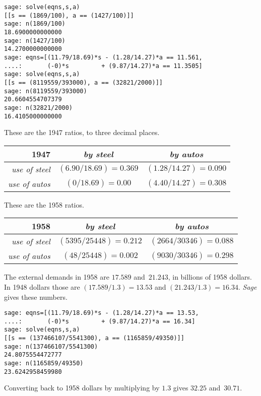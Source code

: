 \begin{exercises}
\begin{answer}
\begin{exparts}
\begin{lstlisting}
sage: solve(eqns,s,a)
[[s == (1869/100), a == (1427/100)]]
sage: n(1869/100)
18.6900000000000
sage: n(1427/100)
14.2700000000000
sage: eqns=[(11.79/18.69)*s - (1.28/14.27)*a == 11.561,
....:       (-0)*s         + (9.87/14.27)*a == 11.3505]
sage: solve(eqns,s,a)
[[s == (8119559/393000), a == (32821/2000)]]
sage: n(8119559/393000)
20.6604554707379
sage: n(32821/2000)
16.4105000000000            
\end{lstlisting}
	\partsitem
          These are the 1947 ratios, to three decimal places.
	  \begin{center}
            \begin{tabular}{r|cc}
               1947   &\textit{by steel}  &\textit{by autos}  \\ \hline
               \textit{use of steel}  &$(6.90/18.69)=0.369$ &$(1.28/14.27)=0.090$  \\
               \textit{use of autos}  &$(0/18.69)=0.00$ &$(4.40/14.27)=0.308$  
            \end{tabular}
          \end{center}
          These are the 1958 ratios.
          \begin{center}
            \begin{tabular}{r|cc}
               1958           &\textit{by steel}  &\textit{by autos}  \\ \hline
               \textit{use of steel}  &$(5395/25448)=0.212$ &$(2664/30346)=0.088$  \\
               \textit{use of autos}  &$(48/25448)=0.002$ &$(9030/30346)=0.298$  
            \end{tabular}
          \end{center}
	\partsitem
          The external demands in 1958 are $17.589$ and~$21.243$,
          in billions of 1958 dollars.
          In 1948 dollars those are $(17.589/1.3)=13.53$ and
          $(21.243/1.3)=16.34$. 
          \textit{Sage} gives these numbers.
\begin{lstlisting}
sage: eqns=[(11.79/18.69)*s - (1.28/14.27)*a == 13.53,
....:       (-0)*s         + (9.87/14.27)*a == 16.34]
sage: solve(eqns,s,a)
[[s == (137466107/5541300), a == (1165859/49350)]]
sage: n(137466107/5541300)
24.8075554472777
sage: n(1165859/49350)
23.6242958459980            
\end{lstlisting}
      Converting back to 1958 dollars by multiplying by $1.3$ gives
      $32.25$ and~$30.71$.
      \end{exparts}
    \end{answer}

\end{exercises}
